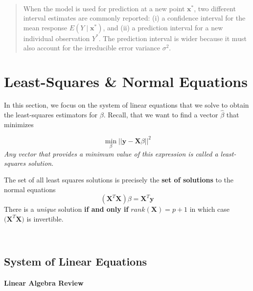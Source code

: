\documentclass[
]{book}
\begin{document}
~

\begin{quote}
When the model is used for prediction at a new point \(\mathbf{x}^*\), two different interval estimates are commonly reported: (i) a confidence interval for the mean response \(E(Y\mid\mathbf{x}^*)\), and (ii) a prediction interval for a new individual observation \(Y^*\).
The prediction interval is wider because it must also account for the irreducible error variance \(\sigma^2\).
\end{quote}

\section{Least-Squares \& Normal Equations}\label{least-squares-normal-equations}

In this section, we focus on the system of linear equations that we solve to obtain the least-squares estimators for \(\beta\). Recall, that we want to find a vector \(\hat{\beta}\) that minimizes

\[\min_{\beta} ||\mathbf{y} - \mathbf{X} \beta||^2\]
\emph{Any vector that provides a minimum value of this expression is called a least-squares solution}.

The set of all least squares solutions is precisely the \textbf{set of solutions} to the normal equations
\[(\mathbf{X}^T \mathbf{X}) \beta = \mathbf{X}^T \mathbf{y}\]
There is a \emph{unique} solution \textbf{if and only if} \(rank(\mathbf{X}) = p+1\) in which case \(\bigl(\mathbf{X}^T \mathbf{X}\bigr)\) is invertible.

~

\subsection*{System of Linear Equations}\label{system-of-linear-equations}

\paragraph*{Linear Algebra Review}\label{linear-algebra-review}
\end{document}
